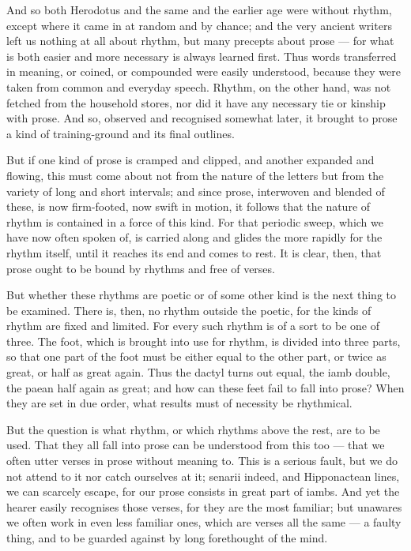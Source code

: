  And so both Herodotus and the same and the earlier age were without rhythm, except where it came in at random and by chance; and the very ancient writers left us nothing at all about rhythm, but many precepts about prose — for what is both easier and more necessary is always learned first. Thus words transferred in meaning, or coined, or compounded were easily understood, because they were taken from common and everyday speech. Rhythm, on the other hand, was not fetched from the household stores, nor did it have any necessary tie or kinship with prose. And so, observed and recognised somewhat later, it brought to prose a kind of training-ground and its final outlines.

 But if one kind of prose is cramped and clipped, and another expanded and flowing, this must come about not from the nature of the letters but from the variety of long and short intervals; and since prose, interwoven and blended of these, is now firm-footed, now swift in motion, it follows that the nature of rhythm is contained in a force of this kind. For that periodic sweep, which we have now often spoken of, is carried along and glides the more rapidly for the rhythm itself, until it reaches its end and comes to rest. It is clear, then, that prose ought to be bound by rhythms and free of verses.

 But whether these rhythms are poetic or of some other kind is the next thing to be examined. There is, then, no rhythm outside the poetic, for the kinds of rhythm are fixed and limited. For every such rhythm is of a sort to be one of three. The foot, which is brought into use for rhythm, is divided into three parts, so that one part of the foot must be either equal to the other part, or twice as great, or half as great again. Thus the dactyl turns out equal, the iamb double, the paean half again as great; and how can these feet fail to fall into prose? When they are set in due order, what results must of necessity be rhythmical.

 But the question is what rhythm, or which rhythms above the rest, are to be used. That they all fall into prose can be understood from this too — that we often utter verses in prose without meaning to. This is a serious fault, but we do not attend to it nor catch ourselves at it; senarii indeed, and Hipponactean lines, we can scarcely escape, for our prose consists in great part of iambs. And yet the hearer easily recognises those verses, for they are the most familiar; but unawares we often work in even less familiar ones, which are verses all the same — a faulty thing, and to be guarded against by long forethought of the mind.

